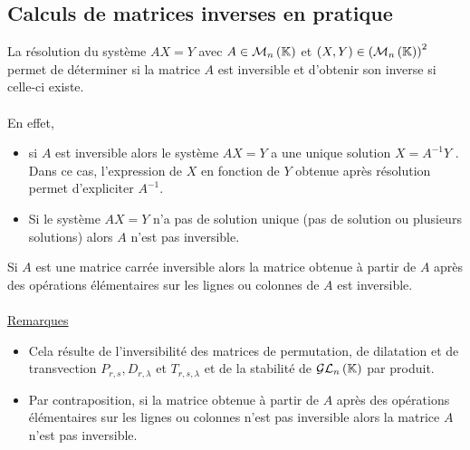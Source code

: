 \subsection{Calculs de matrices inverses en pratique}
\begin{defprop}
    La résolution du système \(AX = Y\) avec \(A \in  \mathcal{M}_n\left(\mathbb{K}\right)\) et \(\left(X, Y \right) \in  \left(\mathcal{M}_n\left(\mathbb{K}\right)\right)^2\) permet de déterminer si la matrice \(A\) est inversible et d’obtenir son inverse si celle-ci existe.\\~\\
    En effet,
    \begin{itemize}
        \item si \(A\) est inversible alors le système \(AX = Y\) a une unique solution \(X = A^{-1}Y\) . Dans ce cas, l’expression de \(X\) en fonction de \(Y\) obtenue après résolution permet d’expliciter \(A^{-1}\).
        \item Si le système \(AX = Y\) n’a pas de solution unique (pas de solution ou plusieurs solutions) alors \(A\) n’est pas inversible.
    \end{itemize}
\end{defprop}

\begin{defprop}
    Si \(A\) est une matrice carrée inversible alors la matrice obtenue à partir de \(A\) après des opérations élémentaires sur les lignes ou colonnes de \(A\) est inversible.\\~\\
    \underline{Remarques}
    \begin{itemize}
        \item Cela résulte de l’inversibilité des matrices de permutation, de dilatation et de transvection \(P_{r,s}, D_{r,\lambda}\) et \(T_{r,s,\lambda}\) et de la stabilité de \(\mathcal{GL}_n\left(\mathbb{K}\right)\) par produit.
        \item Par contraposition, si la matrice obtenue à partir de \(A\) après des opérations élémentaires sur les lignes ou colonnes n’est pas inversible alors la matrice \(A\) n’est pas inversible.
    \end{itemize}

\end{defprop}

